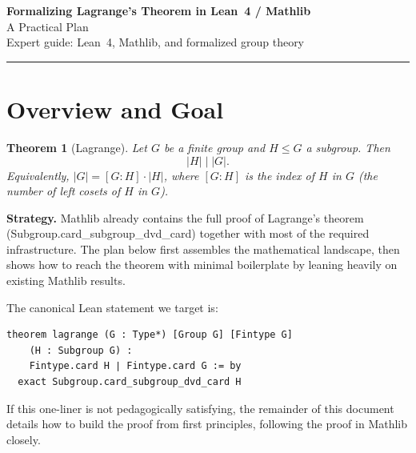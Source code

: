 \documentclass[11pt, a4paper]{article}
\theoremstyle{plain}
\newtheorem{theorem}{Theorem}[section]
\theoremstyle{definition}
\newcommand{\abs}[1]{\lvert #1 \rvert}
\newcommand{\divides}{\mid}
\newcommand{\mathlib}[1]{\textsf{\color{lean-green}#1}}
\begin{document}
\begin{center}
  {\LARGE\bfseries\color{lean-blue}
    Formalizing Lagrange's Theorem in Lean~4 / Mathlib}\\[6pt]
  {\large A Practical Plan}\\[4pt]
  {\small\color{gray} Expert guide: Lean~4, Mathlib, and formalized group theory}
\end{center}

\vspace{4pt}\hrule\vspace{12pt}

\tableofcontents

\newpage

\section{Overview and Goal}

\begin{theorem}[Lagrange]
Let $G$ be a finite group and $H \leq G$ a subgroup. Then
\[
  \abs{H} \divides \abs{G}.
\]
Equivalently, $\abs{G} = [G : H] \cdot \abs{H}$, where $[G : H]$ is the
index of $H$ in $G$ (the number of left cosets of $H$ in $G$).
\end{theorem}

\begin{notebox}
\textbf{Strategy.} Mathlib already contains the full proof of Lagrange's
theorem (\mathlib{Subgroup.card\_subgroup\_dvd\_card}) together with most of
the required infrastructure. The plan below first assembles the mathematical
landscape, then shows how to reach the theorem with minimal boilerplate by
leaning heavily on existing Mathlib results.
\end{notebox}

The canonical Lean statement we target is:

\begin{lstlisting}
theorem lagrange (G : Type*) [Group G] [Fintype G]
    (H : Subgroup G) :
    Fintype.card H ∣ Fintype.card G := by
  exact Subgroup.card_subgroup_dvd_card H
\end{lstlisting}

If this one-liner is not pedagogically satisfying, the remainder of this
document details how to build the proof from first principles, following the
proof in Mathlib closely.

\end{document}
